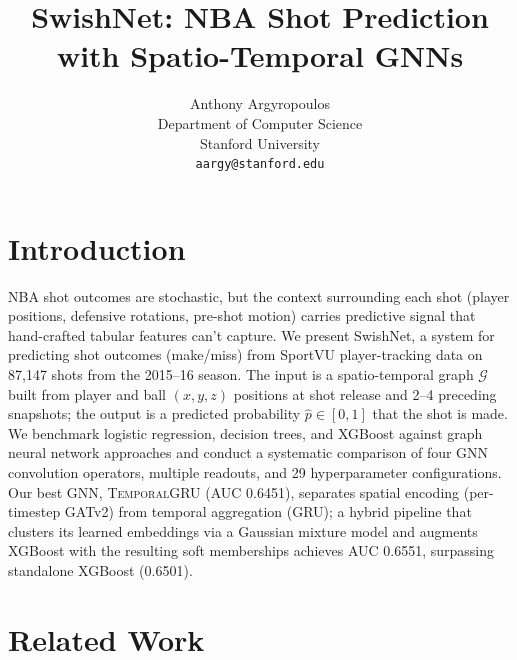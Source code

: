\documentclass{article}
\title{
  SwishNet: NBA Shot Prediction with Spatio-Temporal GNNs
}
\author{
  Anthony Argyropoulos \\
  Department of Computer Science \\
  Stanford University \\
  \texttt{aargy@stanford.edu}
}
\begin{document}
\maketitle
\vspace{-2.5em}

\section{Introduction}

NBA shot outcomes are stochastic, but the context surrounding each shot (player positions, defensive rotations, pre-shot motion) carries predictive signal that hand-crafted tabular features can't capture. We present SwishNet, a system for predicting shot outcomes (make/miss) from SportVU player-tracking data on 87,147 shots from the 2015--16 season. The input is a spatio-temporal graph $\mathcal{G}$ built from player and ball $(x,y,z)$ positions at shot release and 2--4 preceding snapshots; the output is a predicted probability $\hat{p} \in [0,1]$ that the shot is made. We benchmark logistic regression, decision trees, and XGBoost against graph neural network approaches and conduct a systematic comparison of four GNN convolution operators, multiple readouts, and 29 hyperparameter configurations. Our best GNN, \textsc{TemporalGRU} (AUC 0.6451), separates spatial encoding (per-timestep GATv2) from temporal aggregation (GRU); a hybrid pipeline that clusters its learned embeddings via a Gaussian mixture model and augments XGBoost with the resulting soft memberships achieves AUC 0.6551, surpassing standalone XGBoost (0.6501).

\section{Related Work}
\end{document}
